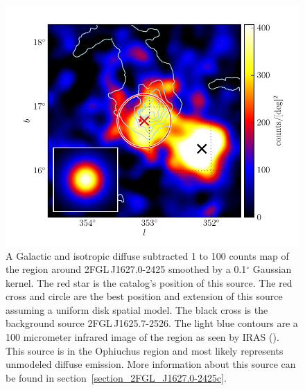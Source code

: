 \documentclass[12pt,preprint]{aastex}
\newcommand{\gev}{\text{GeV}\xspace}
\renewcommand{\deg}{\ensuremath{^\circ}\xspace}
\begin{document}
\begin{figure}
  \begin{center}
    \includegraphics[type=pdf,ext=.pdf,read=.pdf]{source_plots/source_1FGL_J1628.6-2419c}
  \end{center}
  \caption{
  A Galactic and isotropic diffuse subtracted 1 \gev to 100 \gev counts
  map of the region around 2FGL\,J1627.0-2425 smoothed by a 0.1\deg
  Gaussian kernel.  The red star is the catalog's position of
  this source.  The red cross and circle are
  the best position and extension of this source assuming a
  uniform disk spatial model.  The black cross is the background source
  2FGL\,J1625.7-2526.  The light blue contours are a 100 micrometer infrared
  image of the region as seen by IRAS (\cite{iras_rho_ophiuci}). This
  source is in the Ophiuchus region and most likely represents 
  unmodeled diffuse emission.  More information about this source can be found
  in section~\ref{section_2FGL_J1627.0-2425c}.
  }\label{1FGL_J1628.6-2419c}
\end{figure}
\end{document}
